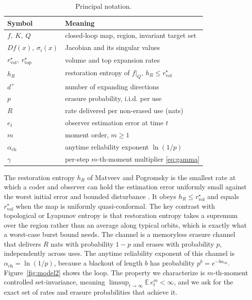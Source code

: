 \documentclass[journal]{IEEEtran}
\theoremstyle{definition}
\theoremstyle{remark}
\newcommand{\rvol}{r^\star_{\mathrm{vol}}}
\newcommand{\rtop}{r^\star_{\mathrm{top}}}
\newcommand{\hR}{h_R}
\newcommand{\ach}{\alpha_{\mathrm{ch}}}
\newcommand{\E}{\mathbb{E}}
\newcommand{\dplus}{d^{+}}
\begin{document}
\begin{table}[t]
\centering
\caption{Principal notation.}
\label{tab:notation2}
\renewcommand{\arraystretch}{1.25}
\begin{tabular}{@{}ll@{}}
\toprule
Symbol & Meaning \\
\midrule
$f,\ K,\ Q$ & closed-loop map, region, invariant target set \\
$Df(x),\ \sigma_i(x)$ & Jacobian and its singular values \\
$\rvol,\ \rtop$ & volume and top expansion rates \\
$\hR$ & restoration entropy of $f|_Q$, $\hR\le\rvol$ \\
$\dplus$ & number of expanding directions \\
$p$ & erasure probability, i.i.d. per use \\
$R$ & rate delivered per non-erased use (nats) \\
$e_t$ & observer estimation error at time $t$ \\
$m$ & moment order, $m\ge1$ \\
$\ach$ & anytime reliability exponent $\ln(1/p)$ \\
$\gamma$ & per-step $m$-th-moment multiplier \eqref{eq:gamma} \\
\bottomrule
\end{tabular}
\end{table}

The restoration entropy $\hR$ of Matveev and Pogromsky is the smallest rate at which a coder and observer can hold
the estimation error uniformly small against the worst initial error and bounded disturbance
\cite{matveevpogromsky2019}. It obeys $\hR\le\rvol$ and equals $\rvol$ when the map is uniformly quasi-conformal.
The key contrast with topological or Lyapunov entropy is that restoration entropy takes a supremum over the
region rather than an average along typical orbits, which is exactly what a worst-case burst bound needs. The
channel is a memoryless erasure channel that delivers $R$ nats with probability $1-p$ and erases with probability
$p$, independently across uses. The anytime reliability exponent of this channel is $\ach=\ln(1/p)$, because a
blackout of length $b$ has probability $p^{b}=e^{-b\ach}$. Figure~\ref{fig:model2} shows the loop. The property we
characterize is $m$-th-moment controlled set-invariance, meaning $\limsup_{t\to\infty}\E\,e_t^{m}<\infty$, and we
ask for the exact set of rates and erasure probabilities that achieve it.
\end{document}
